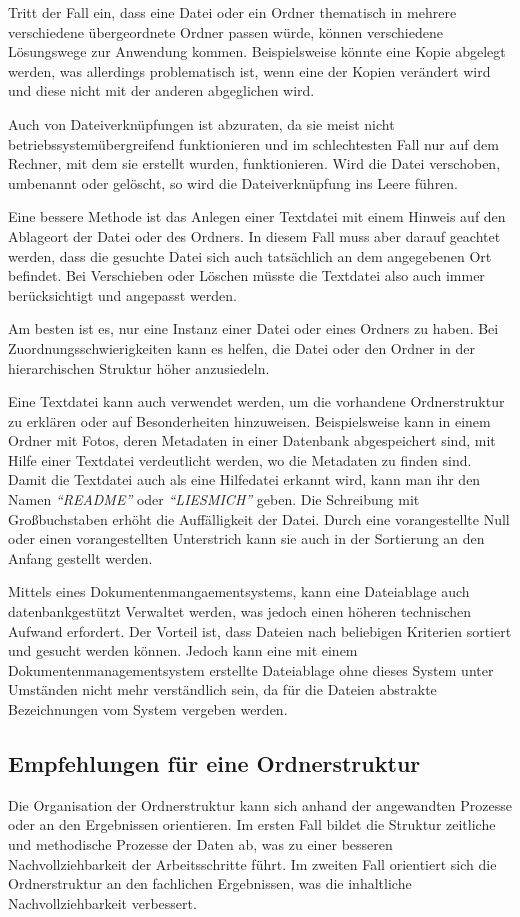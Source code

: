 Tritt der Fall ein, dass eine Datei oder ein Ordner thematisch in mehrere verschiedene übergeordnete Ordner passen würde, können verschiedene Lösungswege zur Anwendung kommen. Beispielsweise könnte eine Kopie abgelegt werden, was allerdings problematisch ist, wenn eine der Kopien verändert wird und diese nicht mit der anderen abgeglichen wird.

Auch von Dateiverknüpfungen ist abzuraten, da sie meist nicht betriebssystemübergreifend funktionieren und im schlechtesten Fall nur auf dem Rechner, mit dem sie erstellt wurden, funktionieren. Wird die Datei verschoben, umbenannt oder gelöscht, so wird die Dateiverknüpfung ins Leere führen.

Eine bessere Methode ist das Anlegen einer Textdatei mit einem Hinweis auf den Ablageort der Datei oder des Ordners. In diesem Fall muss aber darauf geachtet werden, dass die gesuchte Datei sich auch tatsächlich an dem angegebenen Ort befindet. Bei Verschieben oder Löschen müsste die Textdatei also auch immer berücksichtigt und angepasst werden. 

Am besten ist es, nur eine Instanz einer Datei oder eines Ordners zu haben. Bei Zuordnungsschwierigkeiten kann es helfen, die Datei oder den Ordner in der hierarchischen Struktur höher anzusiedeln.

Eine Textdatei kann auch verwendet werden, um die vorhandene Ordnerstruktur zu erklären oder auf Besonderheiten hinzuweisen. Beispielsweise kann in einem Ordner mit Fotos, deren Metadaten in einer Datenbank abgespeichert sind, mit Hilfe einer Textdatei verdeutlicht werden, wo die Metadaten zu finden sind. Damit die Textdatei auch als eine Hilfedatei erkannt wird, kann man ihr den Namen \emph{"`README"'} oder \emph{"`LIESMICH"'} geben. Die Schreibung mit Großbuchstaben erhöht die Auffälligkeit der Datei. Durch eine vorangestellte Null oder einen vorangestellten Unterstrich kann sie auch in der Sortierung an den Anfang gestellt werden.

Mittels eines Dokumentenmangaementsystems, kann eine Dateiablage auch datenbankgestützt Verwaltet werden, was jedoch einen höheren technischen Aufwand erfordert. Der Vorteil ist, dass Dateien nach beliebigen Kriterien sortiert und gesucht werden können. Jedoch kann eine mit einem Dokumentenmanagementsystem erstellte Dateiablage ohne dieses System unter Umständen nicht mehr verständlich sein, da für die Dateien abstrakte Bezeichnungen vom System vergeben werden.

\subsection{Empfehlungen für eine Ordnerstruktur}
Die Organisation der Ordnerstruktur kann sich anhand der angewandten Prozesse oder an den Ergebnissen orientieren. Im ersten Fall bildet die Struktur zeitliche und methodische Prozesse der Daten ab, was zu einer besseren Nachvollziehbarkeit der Arbeitsschritte führt. Im zweiten Fall orientiert sich die Ordnerstruktur an den fachlichen Ergebnissen, was die inhaltliche Nachvollziehbarkeit verbessert.

